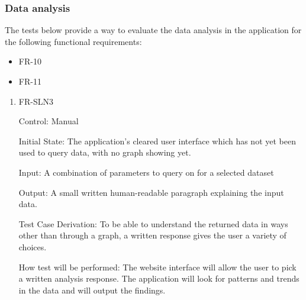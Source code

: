 \documentclass[12pt, titlepage]{article}
\begin{document}
\subsubsection{Data analysis}
    The tests below provide a way to evaluate the data analysis in the application for the following functional requirements:
    \begin{itemize}
      \item FR-10
      \item FR-11
    \end{itemize}
      \begin{enumerate}
      
        \item{FR-SLN3}
        
        Control: Manual
                  
        Initial State: The application's cleared user interface which has not yet been used to query data, with no graph showing yet.
                  
        Input: A combination of parameters to query on for a selected dataset
                  
        Output: A small written human-readable paragraph explaining the input data.
       
        Test Case Derivation: To be able to understand the returned data in ways other than through a graph, a written response gives the user a variety of choices.
                 
        How test will be performed: The website interface will allow the user to pick a written analysis response. The application will look for patterns and trends in the data and will output the findings. 
        
        \end{enumerate}
\end{document}
